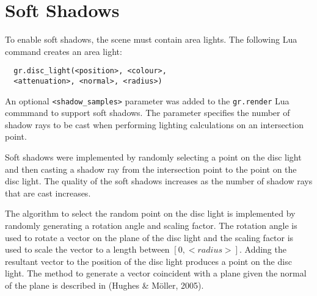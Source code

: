 \section{Soft Shadows}

To enable soft shadows, the scene must contain area lights. The following Lua 
command creates an area light:
\begin{lstlisting}
  gr.disc_light(<position>, <colour>, 
  <attenuation>, <normal>, <radius>)
\end{lstlisting}
  
An optional \verb|<shadow_samples>| parameter was added to the \newline
\verb|gr.render| Lua commmand to support soft shadows. The parameter specifies 
the number of shadow rays to be cast when performing lighting calculations on 
an intersection point.

Soft shadows were implemented by randomly selecting a point on the disc light
and then casting a shadow ray from the intersection point to the point on the
disc light. The quality of the soft shadows increases as the number of shadow
rays that are cast increases.

The algorithm to select the random point on the disc light is implemented by
randomly generating a rotation angle and scaling factor. The rotation angle is
used to rotate a vector on the plane of the disc light and the scaling factor is 
used to scale the vector to a length between $[0, <radius>]$. Adding the 
resultant vector to the position of the disc light produces a point on the disc
light. The method to generate a vector coincident with a plane given the normal
of the plane is described in (Hughes \& M{\"o}ller, 2005).

